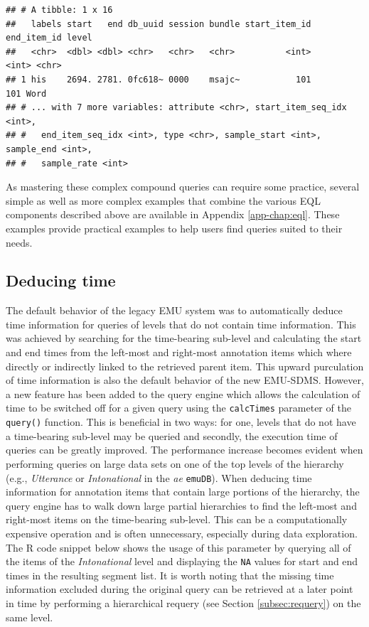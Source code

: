 \documentclass[]{book}
\begin{document}
\begin{verbatim}
## # A tibble: 1 x 16
##   labels start   end db_uuid session bundle start_item_id end_item_id level
##   <chr>  <dbl> <dbl> <chr>   <chr>   <chr>          <int>       <int> <chr>
## 1 his    2694. 2781. 0fc618~ 0000    msajc~           101         101 Word 
## # ... with 7 more variables: attribute <chr>, start_item_seq_idx <int>,
## #   end_item_seq_idx <int>, type <chr>, sample_start <int>, sample_end <int>,
## #   sample_rate <int>
\end{verbatim}

As mastering these complex compound queries can require some practice, several simple as well as more complex examples that combine the various EQL components described above are available in Appendix \ref{app-chap:eql}. These examples provide practical examples to help users find queries suited to their needs.

\hypertarget{subsec:query-deducingTime}{%
\subsection{Deducing time}\label{subsec:query-deducingTime}}

The default behavior of the legacy EMU system was to automatically deduce time information for queries of levels that do not contain time information. This was achieved by searching for the time-bearing sub-level and calculating the start and end times from the left-most and right-most annotation items which where directly or indirectly linked to the retrieved parent item. This upward purculation of time information is also the default behavior of the new EMU-SDMS. However, a new feature has been added to the query engine which allows the calculation of time to be switched off for a given query using the \texttt{calcTimes} parameter of the \texttt{query()} function. This is beneficial in two ways: for one, levels that do not have a time-bearing sub-level may be queried and secondly, the execution time of queries can be greatly improved. The performance increase becomes evident when performing queries on large data sets on one of the top levels of the hierarchy (e.g., \emph{Utterance} or \emph{Intonational} in the \emph{ae} \texttt{emuDB}). When deducing time information for annotation items that contain large portions of the hierarchy, the query engine has to walk down large partial hierarchies to find the left-most and right-most items on the time-bearing sub-level. This can be a computationally expensive operation and is often unnecessary, especially during data exploration. The R code snippet below shows the usage of this parameter by querying all of the items of the \emph{Intonational} level and displaying the \texttt{NA} values for start and end times in the resulting segment list. It is worth noting that the missing time information excluded during the original query can be retrieved at a later point in time by performing a hierarchical requery (see Section \ref{subsec:requery}) on the same level.
\end{document}
